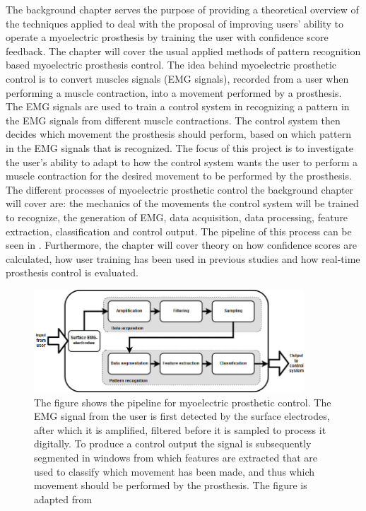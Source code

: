The background chapter serves the purpose of providing a theoretical overview of the techniques applied to deal with the proposal of improving users' ability to operate a myoelectric prosthesis by training the user with confidence score feedback. The chapter will cover the usual applied methods of pattern recognition based myoelectric prosthesis control. The idea behind myoelectric prosthetic control is to  convert muscles signals (EMG signals), recorded from a user when performing a muscle contraction, into a movement performed by a prosthesis. The EMG signals are used to train a control system in recognizing a pattern in the EMG signals from different muscle contractions. The control system then decides which movement the prosthesis should perform, based on which pattern in the EMG signals that is recognized. The focus of this project is to investigate the user's ability to adapt to how the control system wants the user to perform a muscle contraction for the desired movement to be performed by the prosthesis. The different processes of myoelectric prosthetic control the background chapter will cover are: the mechanics of the movements the control system will be trained to recognize, the generation of EMG, data acquisition, data processing, feature extraction, classification and control output. The pipeline of this process can be seen in . Furthermore, the chapter will cover theory on how confidence scores are calculated, how user training has been used in previous studies and how real-time prosthesis control is evaluated.

\begin{figure}[H] 
	\includegraphics[width=0.9\textwidth]{figures/xBackground/prosthesis_control_pipeline}
	\caption{The figure shows the pipeline for myoelectric prosthetic control. The EMG signal from the user is first detected by the surface electrodes, after which it is amplified, filtered before it is sampled to process it digitally. To produce a control output the signal is subsequently segmented in windows from which features are extracted that are used to classify which movement has been made, and thus which movement should be performed by the prosthesis. The figure is adapted from \cite{Peerdeman2011}}
	\label{fig:prothesis_control_pipeline}
\end{figure}
